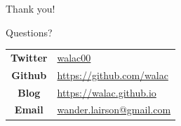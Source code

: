 \documentclass[pdf]{beamer}
\begin{document}
\begin{frame}{Thank you!}
  \begin{center}
    \Huge
    Questions?
  \end{center}

  \begin{center}
    \begin{tabular}{c l}
      \textbf{Twitter} & \href{https://twitter.com/walac00}{walac00} \\
      \textbf{Github} & \url{https://github.com/walac} \\
      \textbf{Blog} & \url{https://walac.github.io} \\
      \textbf{Email} & \href{mailto:wander.lairson@gmail.com}{wander.lairson@gmail.com} \\
    \end{tabular}
  \end{center}

\end{frame}
\end{document}
